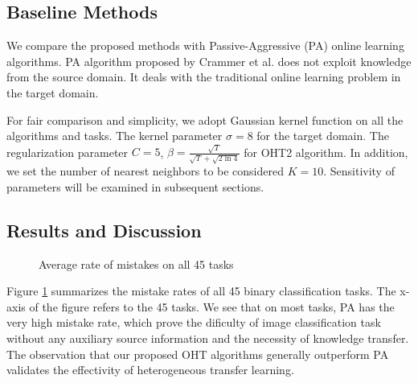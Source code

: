\documentclass[twocolumn]{article}
\begin{document}
\subsection{Baseline Methods}
We compare the proposed methods with Passive-Aggressive (PA) online learning algorithms.
PA algorithm proposed by Crammer et al. does not exploit knowledge from the source domain.
It deals with the traditional online learning problem in the target domain.

For fair comparison and simplicity, we adopt Gaussian kernel function on all the algorithms and tasks.
The kernel parameter $\sigma = 8$ for the target domain.
The regularization parameter $C = 5$, $ \beta = \frac{\sqrt{T}}{\sqrt{T}+\sqrt{2\ln{4}}} $ for OHT2 algorithm.
In addition, we set the number of nearest neighbors to be considered $K = 10$.
Sensitivity of parameters will be examined in subsequent sections.

\subsection{Results and Discussion}
\begin{figure}[!htb]
\begin{center}
\end{center}
  \caption{Average rate of mistakes on all 45 tasks}
  \label{Average rate of mistakes on all 45 tasks}
\end{figure}

Figure \ref{Average rate of mistakes on all 45 tasks} summarizes the mistake rates of all 45 binary classification tasks.
The x-axis of the figure refers to the 45 tasks.
We see that on most tasks, PA has the very high mistake rate, which prove the dificulty of image classification task without any auxiliary source information and the necessity of knowledge transfer.
The observation that our proposed OHT algorithms generally outperform PA validates the effectivity of heterogeneous transfer learning.
\end{document}

